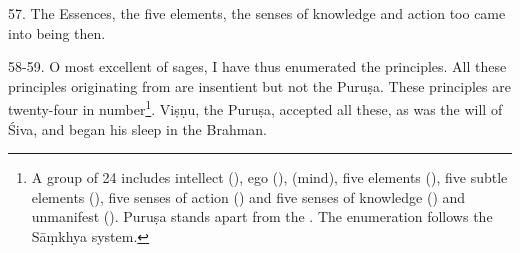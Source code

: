 57. The Essences, the five elements, the senses of knowledge and action too came
into being then.

58-59. O most excellent of sages, I have thus enumerated the principles. All
these principles originating from  are insentient but not the Puruṣa.
These principles are twenty-four in number\footnote{A group of 24 
includes intellect (), ego (),  (mind), five
elements (), five subtle elements (), five senses of
action () and five senses of knowledge () and
unmanifest  (\ie {}). Puruṣa stands apart from
the . The enumeration follows the Sāṃkhya system.}. Viṣṇu,
the Puruṣa, accepted all these, as was the will of Śiva, and began his sleep in
the Brahman.
